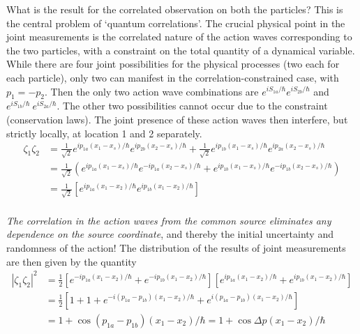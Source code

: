 What is the result for the correlated observation on both the particles? This is the
central problem of `quantum correlations'. The crucial physical point in the joint measurements is the correlated nature of the action waves corresponding to the two particles, with a constraint on the total quantity of a dynamical variable. While there are four joint possibilities for the physical processes (two each for each particle), only two can manifest in the correlation-constrained case, with $p_1 = -p_2$. Then the only two action wave combinations
are $e^{iS_{1a} /\hbar}  e^{iS_{2b} /\hbar}$ and $e^{iS_{1b}/ \hbar} ~e^{iS_{2a}/\hbar}$. The other two possibilities cannot occur due to the
constraint (conservation laws). The joint presence of these action waves then interfere, but strictly locally, at location 1 and 2 separately.
\begin{align*}
\zeta_1 \zeta_2 & = \frac{1}{\sqrt{2}} e^{ip_{1a} (x_1- x_s) /\hbar} e^{ip_{2b} (x_2 -x_s) /\hbar} + \frac{1}{\sqrt{2}} e^{ip_{1b} (x_1 - x_s) /\hbar} e^{ip_{2a} (x_2 - x_s) /\hbar}  \tag{39} \\
& = \frac{1}{\sqrt{2}}  \left(e^{ip_{1a} (x_1- x_s) /\hbar} e^{-ip_{1a} (x_2 -x_s) /\hbar} + e^{ip_{1b} (x_1 - x_s) /\hbar} e^{-ip_{1b} (x_2 - x_s) /\hbar} \right) \tag{40}\\
& = \frac{1}{\sqrt{2}} \left[ e^{ip_{1a} (x_1- x_2) / \hbar} e^{ip_{1b} (x_1 -x_2) /\hbar}  \right]
 \tag{41}\\
\end{align*}

\textit{The correlation in the action waves from the common source eliminates any dependence on
the source coordinate}, and thereby the initial uncertainty and randomness of the action! The
distribution of the results of joint measurements are then given by the quantity
\begin{align*}
|\zeta_1 \zeta_2|^2 & = \frac{1}{2} \left[e^{-ip_{1a} (x_1 -x_2)/\hbar} + e^{-ip_{1b} (x_1-x_2)/\hbar} \right] \left[e^{ip_{1a} (x_1 -x_2) /\hbar} + e^{ip_{1b} (x_1 - x_2)/\hbar} \right] \\
& = \frac{1}{2} \left[1+1+e^{-i(p_{1a} - p_{1b}) (x_1-x_2)/\hbar } + e^{i(p_{1a} -p_{1b}) (x_1-x_2)/\hbar} \right]\\
& = 1 + \cos (p_{1a} - p_{1b}) (x_1 -x_2) / \hbar = 1 + \cos \Delta p (x_1-x_2) / \hbar
\end{align*}


